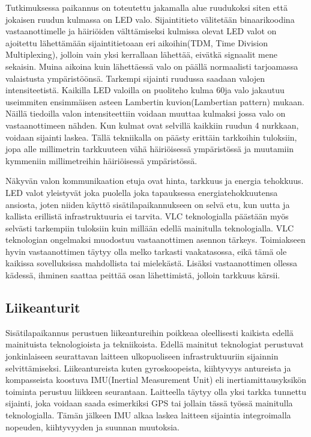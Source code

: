 Tutkimuksessa\cite{VLCA} paikannus on toteutettu jakamalla alue ruudukoksi siten että jokaisen ruudun kulmassa on LED valo. Sijaintitieto välitetään binaarikoodina vastaanottimelle ja häiriöiden välttämiseksi kulmissa olevat LED valot on ajoitettu lähettämään sijaintitietoaan eri aikoihin(TDM, Time Division Multiplexing), jolloin vain yksi kerrallaan lähettää, eivätkä signaalit mene sekaisin. Muina aikoina kuin lähettäessä valo on päällä normaalisti tarjoamassa valaistusta ympäristöönsä. 
Tarkempi sijainti ruudussa saadaan valojen intensiteetistä. Kaikilla LED valoilla on puoliteho kulma 60\degree ja valo jakautuu useimmiten ensimmäisen asteen Lambertin kuvion(Lambertian pattern) mukaan. Näillä tiedoilla valon intensiteettiin voidaan muuttaa kulmaksi jossa valo on vastaanottimeen nähden. Kun kulmat ovat selvillä kaikkiin ruudun 4 nurkkaan, voidaan sijainti laskea.\cite{VLCA}
Tällä tekniikalla on päästy erittäin tarkkoihin tuloksiin, jopa alle millimetrin tarkkuuteen vähä häiriöisessä ympäristössä ja muutamiin kymmeniin millimetreihin häiriöisessä ympäristössä.

Näkyvän valon kommunikaation etuja ovat hinta, tarkkuus ja energia tehokkuus. LED valot yleistyvät joka puolella joka tapauksessa energiatehokkuutensa ansiosta, joten niiden käyttö sisätilapaikannukseen on selvä etu, kun uutta ja kallista erillistä infrastruktuuria ei tarvita. VLC teknologialla päästään myös selvästi tarkempiin tuloksiin kuin millään edellä mainitulla teknologialla.
VLC teknologian ongelmaksi muodostuu vastaanottimen asennon tärkeys. Toimiakseen hyvin vastaanottimen täytyy olla melko tarkasti vaakatasossa, eikä tämä ole kaikissa sovelluksissa mahdollista tai mielekästä. Lisäksi vastaanottimen ollessa kädessä, ihminen saattaa peittää osan lähettimistä, jolloin tarkkuus kärsii.


\subsection{Liikeanturit}
Sisätilapaikannus perustuen liikeantureihin poikkeaa oleellisesti kaikista edellä mainituista teknologioista ja tekniikoista. Edellä mainitut teknologiat perustuvat jonkinlaiseen seurattavan laitteen ulkopuoliseen infrastruktuuriin sijainnin selvittämiseksi. Liikeantureista kuten gyroskoopeista, kiihtyvyys antureista ja kompasseista koostuva IMU(Inertial Measurement Unit) eli inertiamittausyksikön toiminta perustuu liikkeen seurantaan. Laitteella täytyy olla yksi tarkka tunnettu sijainti, joka voidaan saada esimerkiksi GPS tai jollain tässä työssä mainitulla teknologialla.\cite{IMU} Tämän jälkeen IMU alkaa laskea laitteen sijaintia integroimalla nopeuden, kiihtyvyyden ja suunnan muutoksia. 

